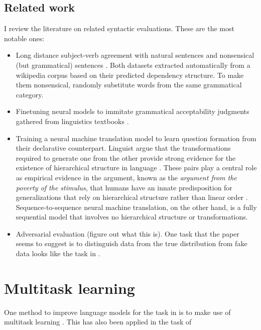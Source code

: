 \subsection{Related work}
I review the literature on related syntactic evaluations. These are the most notable ones:
\begin{itemize}
  \item Long distance subject-verb agreement with natural sentences \citep{Linzen+2016:LSTM-syntax,Kuncoro+2018:RNNG-deps,} and nonsensical (but grammatical) sentences \citep{Gulordava+2018:colorless-green}. Both datasets extracted automatically from a wikipedia corpus based on their predicted dependency structure. To make them nonsensical, \citet{Gulordava+2018:colorless-green} randomly substitute words from the same grammatical category.
  \item Finetuning neural models to immitate grammatical acceptability judgments gathered from linguistics textbooks \citet{DBLP:journals/corr/abs-1805-12471}.
  \item Training a neural machine translation model to learn question formation from their declarative counterpart\cite{McCoy+2018:RNN-pos}. Linguist argue that the transformations required to generate one from the other provide strong evidence for the existence of hierarchical structure in language \cite{Everaert+2015:structures}. These pairs play a central role as empirical evidence in the argument, known as the \textit{argument from the poverty of the stimulus}, that humans have an innate predisposition for generalizations that rely on hierarchical structure rather than linear order \citep{chomsky1980rules}. Sequence-to-sequence neural machine translation, on the other hand, is a fully sequential model that involves no hierarchical structure or transformations.
  \item Adversarial evaluation \citep{Smith2012:adversarial} (figure out what this is). One task that the paper seems to suggest is to distinguish data from the true distribution from fake data looks like the task in \citet{Linzen+2018:targeted}.
\end{itemize}


\section{Multitask learning}
One method to improve language models for the task in \citet{Linzen+2016:LSTM-syntax} is to make use of multitask learning \citep{Enguehard+2017:RNN-multitask}. This has also been applied in the task of \citet{}

